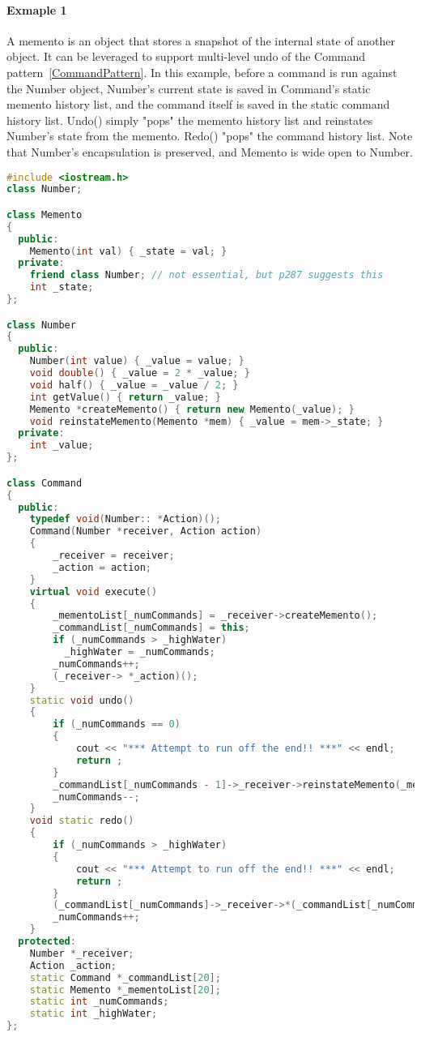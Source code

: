 \documentclass{book}
\begin{document}
\paragraph{Exmaple 1}
A memento is an object that stores a snapshot of the internal state of \colorbox{gray!30}{another object}.
It can be leveraged to support multi-level undo of the Command pattern~\ref{CommandPattern}. 
In this example, before a command is run against the Number object, Number's current state is saved in Command's static memento history list,
and the command itself is saved in the static command history list.
Undo() simply "pops" the memento history list and reinstates Number's state from the memento.
Redo() "pops" the command history list.
Note that Number's encapsulation is preserved, and Memento is wide open to Number.
\begin{lstlisting}[caption={Memento Pattern example 1}, language=C++]
#include <iostream.h>
class Number;

class Memento
{
  public:
    Memento(int val) { _state = val; }
  private:
    friend class Number; // not essential, but p287 suggests this
    int _state;
};

class Number
{
  public:
    Number(int value) { _value = value; }
    void double() { _value = 2 * _value; }
    void half() { _value = _value / 2; }
    int getValue() { return _value; }
    Memento *createMemento() { return new Memento(_value); }
    void reinstateMemento(Memento *mem) { _value = mem->_state; }
  private:
    int _value;
};

class Command
{
  public:
    typedef void(Number:: *Action)();
    Command(Number *receiver, Action action)
    {
        _receiver = receiver;
        _action = action;
    }
    virtual void execute()
    {
        _mementoList[_numCommands] = _receiver->createMemento();
        _commandList[_numCommands] = this;
        if (_numCommands > _highWater)
          _highWater = _numCommands;
        _numCommands++;
        (_receiver-> *_action)();
    }
    static void undo()
    {
        if (_numCommands == 0)
        {
            cout << "*** Attempt to run off the end!! ***" << endl;
            return ;
        }
        _commandList[_numCommands - 1]->_receiver->reinstateMemento(_mementoList[_numCommands - 1]);
        _numCommands--;
    }
    void static redo()
    {
        if (_numCommands > _highWater)
        {
            cout << "*** Attempt to run off the end!! ***" << endl;
            return ;
        }
        (_commandList[_numCommands]->_receiver->*(_commandList[_numCommands] ->_action))();
        _numCommands++;
    }
  protected:
    Number *_receiver;
    Action _action;
    static Command *_commandList[20];
    static Memento *_mementoList[20];
    static int _numCommands;
    static int _highWater;
};


\end{lstlisting}
\end{document}
